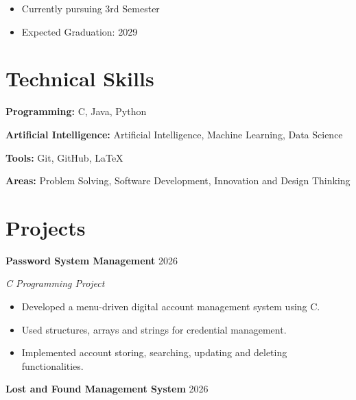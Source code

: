 \documentclass[11pt,a4paper]{article}
\begin{document}
\begin{itemize}
    \item Currently pursuing 3rd Semester
    \item Expected Graduation: 2029
\end{itemize}


\section*{Technical Skills}

\textbf{Programming:}
C, Java, Python

\textbf{Artificial Intelligence:}
Artificial Intelligence, Machine Learning, Data Science

\textbf{Tools:}
Git, GitHub, LaTeX

\textbf{Areas:}
Problem Solving, Software Development,
Innovation and Design Thinking


\section*{Projects}


\textbf{Password System Management}
\hfill
2026

\textit{C Programming Project}

\begin{itemize}

    \item Developed a menu-driven digital account
    management system using C.

    \item Used structures, arrays and strings for
    credential management.

    \item Implemented account storing, searching,
    updating and deleting functionalities.

\end{itemize}


\textbf{Lost and Found Management System}
\hfill
2026
\end{document}
